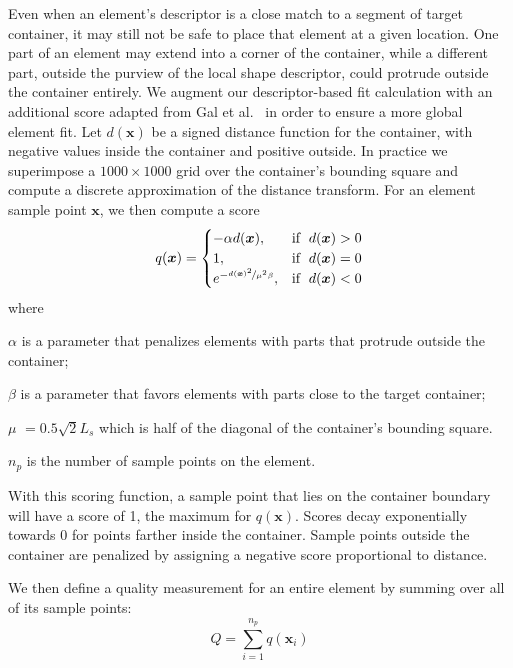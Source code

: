 Even when an element's descriptor is a close match to a segment of target container, 
it may still not be safe to place that element at a given location.
One part of an element may extend into a corner of the container,
while a different part, outside the purview of the local shape descriptor,
could protrude outside the container entirely.  We augment our 
descriptor-based fit calculation with an additional score adapted from
Gal et al.~\cite{Gal2007B} in order to ensure a more global element fit.
Let $d(\bm{x})$ be a signed distance function for the container, with
negative values inside the container and positive outside.  In practice we
superimpose a $1000\times 1000$ grid over the container's bounding square and
compute a discrete approximation of the distance transform.  For an element
sample point $\bm{x}$, we then compute a score
\begin{equation}
 q(\bm{x}) =\begin{cases}    
    - \alpha d(\bm{x}), & \mathrm{if}\;\; d(\bm{x}) > 0  \\    
    1, & \mathrm{if} \;\;d(\bm{x}) = 0 \\
    e^{-\nicefrac{d(\bm{x})^2}{\mu^2\beta}}, & \mathrm{if} \;\; d(\bm{x}) < 0
  \end{cases}
\end{equation}
where 
\begin{packeddescriptions}
  \item[$\alpha$] is a parameter that penalizes elements with parts that protrude outside the container;
  \item[$\beta$] is a parameter that favors elements with parts close to the target container;
  \item[$\mu$] $= 0.5 \sqrt{2}L_{s}$ which is half of the diagonal of the container's bounding square.
  \item[$n_p$] is the number of sample points on the element.
\end{packeddescriptions}

With this scoring function, a sample point that lies on the container boundary
will have a score of 1, the maximum for $q(\bm{x})$.
Scores decay exponentially towards 0
for points farther inside the container.  Sample points outside the container
are penalized by assigning a negative score proportional to distance.


We then define a quality measurement for an entire element by summing over
all of its sample points:
\begin{equation}
Q = \sum_{i = 1}^{n_p} q(\bm{x}_i)
\end{equation}

